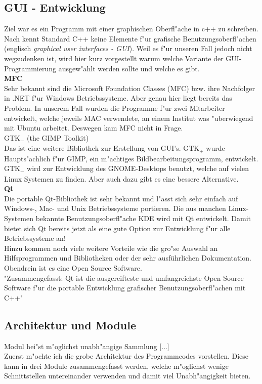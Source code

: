 \documentclass[11pt, a4paper, german]{article}
\theoremstyle{plain}
\begin{document}
	\subsection{GUI - Entwicklung}
	Ziel war es ein Programm mit einer graphischen Oberfl"ache in c++ zu schreiben. Nach \cite[14 - Grafische Benutzungsschnittstellen]{breymann2011c++} kennt Standard C++ keine Elemente f"ur grafische Benutzungsoberfl"achen (englisch \textit{graphical user interfaces - GUI}). Weil es f"ur unseren Fall jedoch nicht wegzudenken ist, wird hier kurz vorgestellt warum welche Variante der GUI-Programmierung ausgew"ahlt werden sollte und welche es gibt.\\
	
	\textbf{MFC}\\
	Sehr bekannt sind die Microsoft Foundation Classes (MFC) bzw. ihre Nachfolger in .NET f"ur Windows Betriebssysteme. Aber genau hier liegt bereits das Problem. In unserem Fall wurden die Programme f"ur zwei Mitarbeiter entwickelt, welche jeweils MAC verwendete, an einem Institut was "uberwiegend mit Ubuntu arbeitet. Deswegen kam MFC nicht in Frage.\\
	
	\textbf{$ \text{GTK}_+ $ }(the GIMP Toolkit)\\
	Das ist eine weitere Bibliothek zur Erstellung von GUI's. $ \text{GTK}_+ $ wurde Haupts"achlich f"ur GIMP, ein m"achtiges Bildbearbeitungsprogramm, entwickelt. $ \text{GTK}_+ $ wird zur Entwicklung des GNOME-Desktops benutzt, welche auf vielen Linux Systemen zu finden. Aber auch dazu gibt es eine bessere Alternative.\\
	
	\textbf{Qt}\\
	Die portable Qt-Bibliothek ist sehr bekannt und l"asst sich sehr einfach auf Windows-, Mac- und Unix Betriebssysteme portieren. Die aus manchen Linux-Systemen bekannte Benutzungsoberfl"ache KDE wird mit Qt entwickelt. Damit bietet sich Qt bereits jetzt als eine gute Option zur Entwicklung f"ur alle Betriebssysteme an!\\
	Hinzu kommen noch viele weitere Vorteile wie die gro"se Auswahl an Hilfsprogrammen und Bibliotheken oder der sehr ausführlichen Dokumentation. Obendrein ist es eine Open Source Software.\\
	"{}Zusammengefasst: Qt ist die ausgereifteste und umfangreichste Open Source Software f"ur die portable Entwicklung grafischer Benutzungsoberfl"achen mit C++"{}\cite[S.452]{breymann2011c++}

	\subsection{Architektur und Module}
	Modul hei"st m"oglichst unabh"angige Sammlung [...]\\
	Zuerst m"ochte ich die grobe Architektur des Programmcodes vorstellen. Diese kann in drei Module zusammengefasst werden, welche m"oglichst wenige Schnittstellen untereinander verwenden und damit viel Unabh"angigkeit bieten.
	
\end{document}
